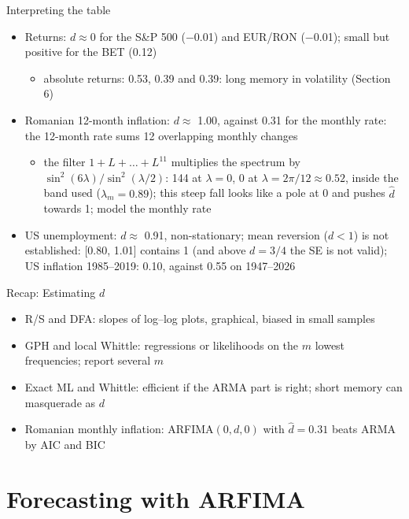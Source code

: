 \begin{frame}{Interpreting the table}
\itemsize{\small}
\begin{itemize}
    \item Returns: $d \approx 0$ for the S\&P 500 ($-$0.01) and EUR/RON ($-$0.01); small but positive for the BET (0.12)
    \begin{itemize}
        \item absolute returns: 0.53, 0.39 and 0.39: long memory in volatility (Section 6)
    \end{itemize}
    \item Romanian 12-month inflation: $d \approx$ 1.00, against 0.31 for the monthly rate: the 12-month rate sums 12 overlapping monthly changes
    \begin{itemize}
        \item the filter $1 + L + \dots + L^{11}$ multiplies the spectrum by $\sin^2(6\lambda)/\sin^2(\lambda/2)$: 144 at $\lambda = 0$, 0 at $\lambda = 2\pi/12 \approx 0.52$, inside the band used ($\lambda_m = 0.89$); this steep fall looks like a pole at 0 and pushes $\hat d$ towards 1; model the monthly rate
    \end{itemize}
    \item US unemployment: $d \approx$ 0.91, non-stationary; mean reversion ($d < 1$) is not established: [0.80, 1.01] contains 1 (and above $d = 3/4$ the SE is not valid); US inflation 1985--2019: 0.10, against 0.55 on 1947--2026
\end{itemize}
\end{frame}

\begin{frame}{Recap: Estimating $d$}
\itemsize{\small}
\begin{itemize}
    \item R/S and DFA: slopes of log--log plots, graphical, biased in small samples
    \item GPH and local Whittle: regressions or likelihoods on the $m$ lowest frequencies; report several $m$
    \item Exact ML and Whittle: efficient if the ARMA part is right; short memory can masquerade as $d$
    \item Romanian monthly inflation: ARFIMA$(0,d,0)$ with $\hat d = 0.31$ beats ARMA by AIC and BIC
\end{itemize}
\end{frame}


\section{Forecasting with ARFIMA}

